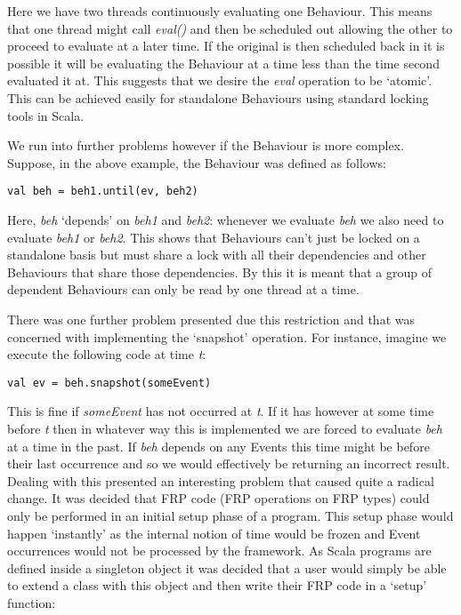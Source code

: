       Here we have two threads continuously evaluating one Behaviour. This means that one thread
      might call \emph{eval()} and then be scheduled out allowing the other to proceed to evaluate
      at a later time. If the original is then scheduled back in it is possible it will
      be evaluating the Behaviour at a time less than the time second evaluated it at. This suggests
      that we desire the \emph{eval} operation to be `atomic'. This can be achieved easily for standalone
      Behaviours using standard locking tools in Scala.
      
      We run into further problems however if the Behaviour is more complex. Suppose, in the above example,
      the Behaviour was defined as follows:

\begin{verbatim}
val beh = beh1.until(ev, beh2)
\end{verbatim}        

      Here, \emph{beh} `depends' on \emph{beh1} and \emph{beh2}: whenever we evaluate \emph{beh}
      we also need to evaluate \emph{beh1} or \emph{beh2}. This shows that Behaviours can't just
      be locked on a standalone basis but must share a lock with all their dependencies and other Behaviours
      that share those dependencies. By this it is meant that a group of dependent Behaviours can
      only be read by one thread at a time.
      
      There was one further problem presented due this restriction and that was concerned with
      implementing the `snapshot' operation. For instance, imagine we execute the following code
      at time \emph{t}:
      
\begin{verbatim}
val ev = beh.snapshot(someEvent)
\end{verbatim}

      This is fine if \emph{someEvent} has not occurred at \emph{t}. If it has however at some time
      before \emph{t} then in whatever way this is implemented we are forced to evaluate \emph{beh}
      at a time in the past. If \emph{beh} depends on any Events this time might be before their
      last occurrence and so we would effectively be returning an incorrect result. Dealing with this
      presented an interesting problem that caused quite a radical change. It was decided that FRP
      code (FRP operations on FRP types) could only be performed in an initial setup phase of a program.
      This setup phase would happen `instantly' as the internal notion of time would be frozen and Event
      occurrences would not be processed by the framework. As Scala programs are defined inside a singleton
      object it was decided that a user would simply be able to extend a class with this object and then
      write their FRP code in a `setup' function:
 
